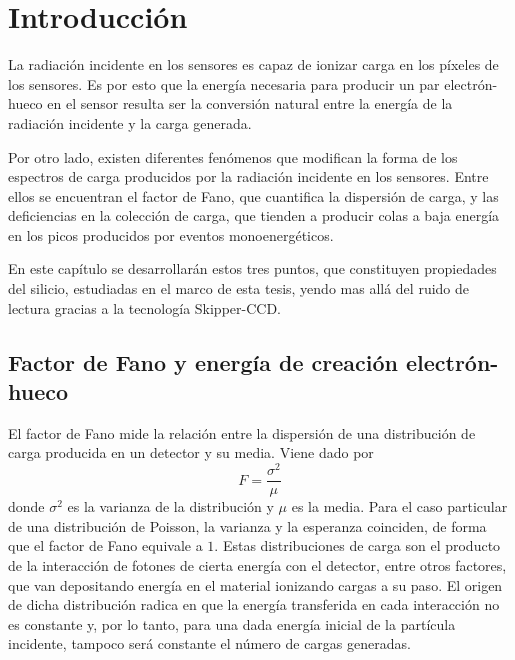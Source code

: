 \newpage
{}  %
\setcounter{page}{1}    %

\chapter{Introducción}
\noindent La radiación incidente en los sensores es capaz de ionizar carga en los píxeles de los sensores. Es por esto que la energía necesaria para producir un par electrón-hueco en el sensor resulta ser la conversión natural entre la energía de la radiación incidente y la carga generada. 

Por otro lado, existen diferentes fenómenos que modifican la forma de los espectros de carga producidos por la radiación incidente en los sensores. Entre ellos se encuentran el factor de Fano, que cuantifica la dispersión de carga, y las deficiencias en la colección de carga, que tienden a producir colas a baja energía en los picos producidos por eventos monoenergéticos.

En este capítulo se desarrollarán estos tres puntos, que constituyen propiedades del silicio, estudiadas en el marco de esta tesis, yendo mas allá del ruido de lectura gracias a la tecnología Skipper-CCD.


\section{Factor de Fano y energía de creación electrón-hueco}
\noindent El factor de Fano mide la relación entre la dispersión de una distribución de carga producida en un detector y su media. Viene dado por
\begin{equation*}
    F = \frac{\sigma^{2}}{\mu}
\end{equation*}
donde $\sigma^{2}$ es la varianza de la distribución y $\mu$ es la media. Para el caso particular de una distribución de Poisson, la varianza y la esperanza coinciden, de forma que el factor de Fano equivale a $1$. Estas distribuciones de carga son el producto de la interacción de fotones de cierta energía con el detector, entre otros factores, que van depositando energía en el material ionizando cargas a su paso. El origen de dicha distribución radica en que la energía transferida en cada interacción no es constante y, por lo tanto, para una dada energía inicial de la partícula incidente, tampoco será constante el número de cargas generadas.

